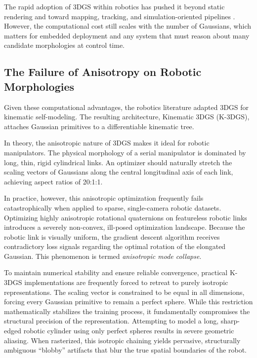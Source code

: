 \documentclass[12pt,a4paper,oneside]{report}
\begin{document}
The rapid adoption of 3DGS within robotics has pushed it beyond static rendering and toward mapping, tracking, and simulation-oriented pipelines \cite{matsuki2024gaussian, keetha2024splattam, guedon2024sugar, lassanske2024gaurast}. However, the computational cost still scales with the number of Gaussians, which matters for embedded deployment and any system that must reason about many candidate morphologies at control time.

\subsection{The Failure of Anisotropy on Robotic Morphologies}

Given these computational advantages, the robotics literature adapted 3DGS for kinematic self-modeling. The resulting architecture, Kinematic 3DGS (K-3DGS), attaches Gaussian primitives to a differentiable kinematic tree.

In theory, the anisotropic nature of 3DGS makes it ideal for robotic manipulators. The physical morphology of a serial manipulator is dominated by long, thin, rigid cylindrical links. An optimizer should naturally stretch the scaling vectors of Gaussians along the central longitudinal axis of each link, achieving aspect ratios of 20:1:1.

In practice, however, this anisotropic optimization frequently fails catastrophically when applied to sparse, single-camera robotic datasets. Optimizing highly anisotropic rotational quaternions on featureless robotic links introduces a severely non-convex, ill-posed optimization landscape. Because the robotic link is visually uniform, the gradient descent algorithm receives contradictory loss signals regarding the optimal rotation of the elongated Gaussian. This phenomenon is termed \textit{anisotropic mode collapse}.

To maintain numerical stability and ensure reliable convergence, practical K-3DGS implementations are frequently forced to retreat to purely isotropic representations. The scaling vector is constrained to be equal in all dimensions, forcing every Gaussian primitive to remain a perfect sphere. While this restriction mathematically stabilizes the training process, it fundamentally compromises the structural precision of the representation. Attempting to model a long, sharp-edged robotic cylinder using only perfect spheres results in severe geometric aliasing. When rasterized, this isotropic chaining yields pervasive, structurally ambiguous ``blobby'' artifacts that blur the true spatial boundaries of the robot.
\end{document}

